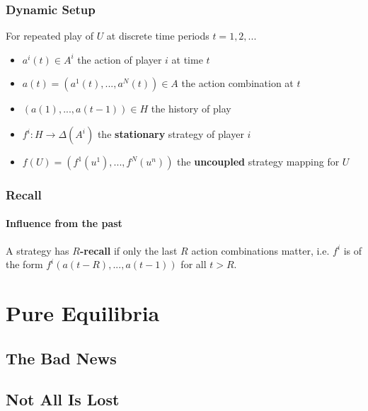\documentclass{beamer}
\begin{document}
\begin{frame}
    \frametitle{Dynamic Setup}
    \begin{definition}
        For repeated play of $U$ at discrete time periods $t = 1, 2, ...$
        \begin{itemize}
            \item $a^i(t) \in A^i$ the action of player $i$ at time $t$
            \item $a(t) = (a^1(t), ..., a^N(t)) \in A$ the action combination at $t$
            \item $(a(1), ..., a(t-1)) \in H$ the history of play
        \end{itemize}
    \end{definition}
    \pause
    \begin{definition}[Strategies]
        \begin{itemize}
            \item $f^i : H \to \Delta(A^i)$ the \textbf{stationary} strategy of player $i$
            \item $f(U) = (f^1(u^1), ..., f^N(u^n))$ the \textbf{uncoupled} strategy mapping for $U$
        \end{itemize}
    \end{definition}
\end{frame}

\begin{frame}
    \frametitle{Recall}
    \framesubtitle{Influence from the past}
    \begin{definition}
        A strategy has $R$\textbf{-recall} if only the last $R$ action combinations matter,
        i.e. $f^i$ is of the form $f^i(a(t-R), ..., a(t-1))$ for all $t > R$.
    \end{definition}
%
\end{frame}

\section{Pure Equilibria}
\subsection{The Bad News}


\subsection{Not All Is Lost}
\end{document}
